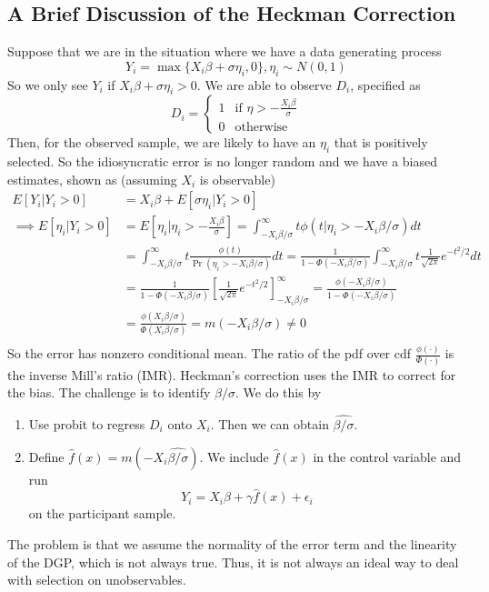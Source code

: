 \documentclass[12pt]{article}
\theoremstyle{definition}
\theoremstyle{property}
\theoremstyle{assumption}
\theoremstyle{example}
\theoremstyle{comment}
\begin{document}
\subsection{A Brief Discussion of the Heckman Correction}
Suppose that we are in the situation where we have a data generating process
\[
Y_i = \max\{X_i\beta+\sigma\eta_i, 0\}, \eta_i \sim N(0,1)
\]
So we only see $Y_i$ if $X_i\beta+\sigma\eta_i>0$. We are able to observe $D_i$, specified as
\[
D_i=\begin{cases}1 & \text{if }\eta>-\frac{X_i\beta}{\sigma}\\ 0 & \text{otherwise} \end{cases}
\]
Then, for the observed sample, we are likely to have an $\eta_i$ that is positively selected. So the idiosyncratic error is no longer random and we have a biased estimates, shown as (assuming $X_i$ is observable)
\footnotesize{\begin{align*}
E[Y_i|Y_i>0]&= X_i\beta + E[\sigma\eta_i|Y_i>0]\\
\implies E[\eta_i|Y_i>0]& =E\left[\eta_i| \eta_i>-\frac{X_i\beta}{\sigma}\right]=\int_{-X_i\beta/\sigma}^\infty t\phi(t|\eta_i>-X_i\beta/\sigma)dt\\
&=\int_{-X_i\beta/\sigma}^\infty t\frac{\phi(t)}{\Pr(\eta_i>-X_i\beta/\sigma)}dt =\frac{1}{1-\Phi(-X_i\beta/\sigma)}\int_{-X_i\beta/\sigma}^\infty t\frac{1}{\sqrt{2\pi}}e^{-t^2/2}dt\\
&=\frac{1}{1-\Phi(-X_i\beta/\sigma)}\left[\frac{1}{\sqrt{2\pi}}e^{-t^2/2}\right]_{-X_i\beta/\sigma}^\infty=\frac{\phi(-X_i\beta/\sigma)}{1-\Phi(-X_i\beta/\sigma)}\\
&=\frac{\phi(X_i\beta/\sigma)}{\Phi(X_i\beta/\sigma)}=m(-X_i\beta/\sigma)\neq0\\
\end{align*}}\normalsize
So the error has nonzero conditional mean. The ratio of the pdf over cdf $\frac{\phi(\cdot)}{\Phi(\cdot)}$ is the inverse Mill's ratio (IMR). Heckman's correction uses the IMR to correct for the bias. The challenge is to identify $\beta/\sigma$. We do this by
\begin{enumerate}
\item Use probit to regress $D_i$ onto $X_i$. Then we can obtain $\widehat{\beta/\sigma}$.
\item Define $\hat{f}(x)=m(-X_i\widehat{\beta/\sigma})$. We include $\hat{f}(x)$ in the control variable and run
\[
Y_i = X_i\beta+ \gamma\hat{f}(x)+\epsilon_i
\]
on the participant sample. 
\end{enumerate}\par
The problem is that we assume the normality of the error term and the linearity of the DGP, which is not always true. Thus, it is not always an ideal way to deal with selection on unobservables. 
\end{document}
